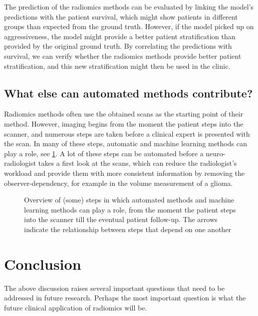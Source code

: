 The prediction of the radiomics methods can be evaluated by linking the model's predictions with the patient survival, which might show patients in different groups than expected from the ground truth.
However, if the model picked up on aggressiveness, the model might provide a better patient stratification than provided by the original ground truth.
By correlating the predictions with survival, we can verify whether the radiomics methods provide better patient stratification, and this new stratification might then be used in the clinic.

\subsection{What else can automated methods contribute?}

Radiomics methods often use the obtained scans as the starting point of their method.
However, imaging begins from the moment the patient steps into the scanner, and numerous steps are taken before a clinical expert is presented with the scan.
In many of these steps, automatic and machine learning methods can play a role, see \cref{fig:discussion_pipeline_automatic}.
A lot of these steps can be automated before a neuro-radiologist takes a first look at the scans, which can reduce the radiologist's workload and provide them with more consistent information by removing the observer-dependency, for example in the volume measurement of a \gls{glioma}.

\begin{figure}[hbt]
    \centering
    \caption{Overview of (some) steps in which automated methods and machine learning methods can play a role, from the moment the patient steps into the scanner till the eventual patient follow-up. The arrows indicate the relationship between steps that depend on one another}\label{fig:discussion_pipeline_automatic}
\end{figure}


\section{Conclusion}\label{sec:discussion_conclusion}


The above discussion raises several important questions that need to be addressed in future research.
Perhaps the most important question is what the future clinical application of radiomics will be.

